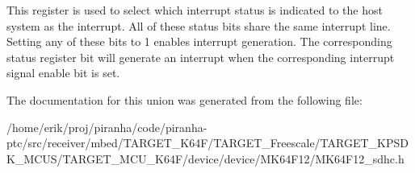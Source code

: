 This register is used to select which interrupt status is indicated to the host system as the interrupt. All of these status bits share the same interrupt line. Setting any of these bits to 1 enables interrupt generation. The corresponding status register bit will generate an interrupt when the corresponding interrupt signal enable bit is set. 

The documentation for this union was generated from the following file\+:\begin{DoxyCompactItemize}
\item 
/home/erik/proj/piranha/code/piranha-\/ptc/src/receiver/mbed/\+T\+A\+R\+G\+E\+T\+\_\+\+K64\+F/\+T\+A\+R\+G\+E\+T\+\_\+\+Freescale/\+T\+A\+R\+G\+E\+T\+\_\+\+K\+P\+S\+D\+K\+\_\+\+M\+C\+U\+S/\+T\+A\+R\+G\+E\+T\+\_\+\+M\+C\+U\+\_\+\+K64\+F/device/device/\+M\+K64\+F12/M\+K64\+F12\+\_\+sdhc.\+h\end{DoxyCompactItemize}
